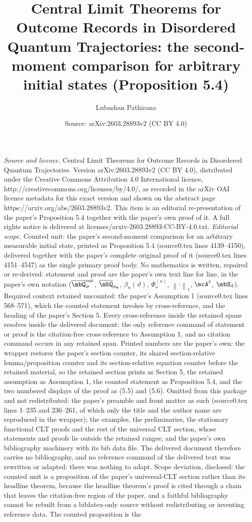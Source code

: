 \documentclass[10pt,a4paper]{amsart}
\title[Central limit theorems for outcome records]{Central Limit Theorems for Outcome Records in Disordered Quantum Trajectories: the second-moment comparison for arbitrary initial states (Proposition 5.4)}
\author[Lubashan Pathirana]{Lubashan Pathirana}
\date{Source: arXiv:2603.28893v2 (CC BY 4.0)}
\numberwithin{equation}{section}   %
\theoremstyle{plain}   %
\theoremstyle{plain}   %
\theoremstyle{examplestyle}
\DeclareMathOperator{\states}{\mbS_d}   %
\newcommand{\s}{\rho_{\mathsf{ss}}}     %
\newcommand{\unorm}[1]{\left\lVert#1\right\rVert}
\begin{document}
\maketitle
\vspace{1em}
\noindent\textit{Source and licence.} Central Limit Theorems for Outcome Records in Disordered Quantum Trajectories. Version arXiv:2603.28893v2 (CC BY 4.0), distributed under the Creative Commons Attribution 4.0 International licence, http://creativecommons.org/licenses/by/4.0/, as recorded in the arXiv OAI licence metadata for this exact version and shown on the abstract page https://arxiv.org/abs/2603.28893v2. This item is an editorial re-presentation of the paper's Proposition 5.4 together with the paper's own proof of it. A full rights notice is delivered at licenses/arxiv-2603.28893-CC-BY-4.0.txt.
\noindent\textit{Editorial scope.} Counted unit: the paper's second-moment comparison for an arbitrary measurable initial state, printed as Proposition 5.4 (source0.tex lines 4139--4150), delivered together with the paper's complete original proof of it (source0.tex lines 4151--4547) as the single primary proof body. No mathematics is written, repaired or re-derived: statement and proof are the paper's own text line for line, in the paper's own notation ($\overline\mbQ^{\mathrm{out}}_\vartheta$, $\overline\mbQ_{\s}$, $\beta_n(\vartheta)$, $\Phi^{(n)}_\omega$, $\unorm{\cdot}_1$, $\mcA^\ell$, $\states$). Required context retained uncounted: the paper's Assumption 1 (source0.tex lines 568--571), which the counted statement invokes by cross-reference, and the heading of the paper's Section 5. Every cross-reference inside the retained spans resolves inside the delivered document: the only reference command of statement or proof is the citation-free cross-reference to Assumption 1, and no citation command occurs in any retained span. Printed numbers are the paper's own: the wrapper restores the paper's section counter, its shared section-relative lemma/proposition counter and its section-relative equation counter before the retained material, so the retained section prints as Section 5, the retained assumption as Assumption 1, the counted statement as Proposition 5.4, and the two numbered displays of the proof as (5.5) and (5.6). Omitted from this package and not redistributed: the paper's preamble and front matter as such (source0.tex lines 1--235 and 236--261, of which only the title and the author name are reproduced in the wrapper); the examples, the preliminaries, the stationary functional CLT proofs and the rest of the universal CLT section, whose statements and proofs lie outside the retained ranges; and the paper's own bibliography machinery with its bib data file. The delivered document therefore carries no bibliography, and no reference command of the delivered text was rewritten or adapted: there was nothing to adapt. Scope deviation, disclosed: the counted unit is a proposition of the paper's universal-CLT section rather than its headline theorem, because the headline theorem's proof is cited through a chain that leaves the citation-free region of the paper, and a faithful bibliography cannot be rebuilt from a biblatex-only source without redistributing or inventing reference data. The counted proposition is the 
\end{document}
